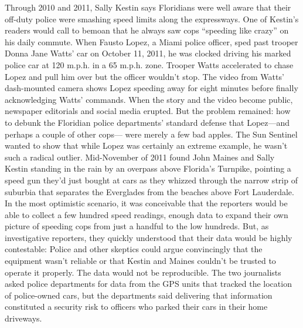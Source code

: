 Through 2010 and 2011, Sally Kestin says Floridians were well aware that
their off-duty police were smashing speed limits along the expressways. One
of Kestin's readers would call to bemoan that he always saw cops ``speeding
like crazy'' on his daily commute.
When Fausto Lopez, a Miami police officer, sped past trooper Donna Jane
Watts' car on October 11, 2011, he was clocked driving his marked police
car at 120 m.p.h. in a 65 m.p.h. zone. Trooper Watts accelerated to chase
Lopez and pull him over but the officer wouldn't stop. The video from
Watts' dash-mounted camera shows Lopez speeding away for eight minutes
before finally acknowledging Watts' commands. When the story and
the video become public, newspaper editorials and social media erupted.
But the problem remained: how to debunk the Floridian police departments'
standard defense that Lopez—and perhaps a couple of other cops—
were merely a few bad apples. The Sun Sentinel wanted to show that while
Lopez was certainly an extreme example, he wasn't such a radical outlier.
Mid-November of 2011 found John Maines and Sally Kestin standing in the
rain by an overpass above Florida's Turnpike, pointing a speed gun they'd
just bought at cars as they whizzed through the narrow strip of suburbia
that separates the Everglades from the beaches above Fort Lauderdale. In
the most optimistic scenario, it was conceivable that the reporters would be
able to collect a few hundred speed readings, enough data to expand their
own picture of speeding cops from just a handful to the low hundreds. But,
as investigative reporters, they quickly understood that their data would be
highly contestable: Police and other skeptics could argue convincingly that
the equipment wasn't reliable or that Kestin and Maines couldn't be trusted
to operate it properly. The data would not be reproducible. The two journalists
asked police departments for data from the GPS units that tracked
the location of police-owned cars, but the departments said delivering that
information constituted a security risk to officers who parked their cars in
their home driveways.

